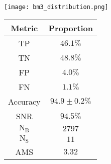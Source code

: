 \begin{minipage}{\textwidth}
  \begin{minipage}[htbp]{0.65\textwidth}
    \centering
    \texttt{[image: bm3\_distribution.png]}
    \label{fig:dist_bm3}
  \end{minipage}
  \hfill
  \begin{minipage}[htbp]{0.34\textwidth}
        \centering
        \begin{tabular}{c|c} 
        \toprule
        Metric & Proportion \\
        \midrule
        \rowcolor{gray!6} TP & $46.1 \%$ \\
        TN & $48.8 \%$ \\
        \rowcolor{gray!6} FP & $4.0 \%$\\
        FN & $1.1 \%$ \\
        \rowcolor{gray!6} Accuracy & $94.9 \pm 0.2 \%$ \\
        SNR & $94.5 \%$ \\
        \midrule
        \rowcolor{gray!6} $\text{N}_\text{B}$ & $2797$ \\
        $\text{N}_\text{S}$ & $11$ \\
        \rowcolor{gray!6} AMS & $3.32$ \\
        \bottomrule
        \end{tabular}
        \label{tab:Values3}
    \end{minipage}
\end{minipage}


